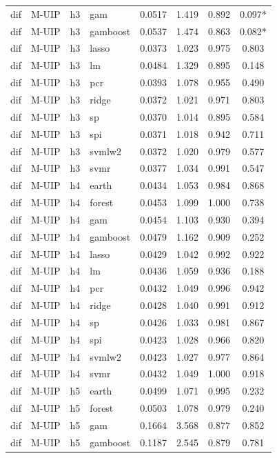 \begin{ThreePartTable}
\begin{longtable}[t]{llclcccc}
dif & M-UIP & h3 & gam & 0.0517 & 1.419 & 0.892 & 0.097*\\
dif & M-UIP & h3 & gamboost & 0.0537 & 1.474 & 0.863 & 0.082*\\
dif & M-UIP & h3 & lasso & 0.0373 & 1.023 & 0.975 & 0.803\\
dif & M-UIP & h3 & lm & 0.0484 & 1.329 & 0.895 & 0.148\\
dif & M-UIP & h3 & pcr & 0.0393 & 1.078 & 0.955 & 0.490\\
dif & M-UIP & h3 & ridge & 0.0372 & 1.021 & 0.971 & 0.803\\
dif & M-UIP & h3 & sp & 0.0370 & 1.014 & 0.895 & 0.584\\
dif & M-UIP & h3 & spi & 0.0371 & 1.018 & 0.942 & 0.711\\
dif & M-UIP & h3 & svmlw2 & 0.0372 & 1.020 & 0.979 & 0.577\\
dif & M-UIP & h3 & svmr & 0.0377 & 1.034 & 0.991 & 0.547\\
\addlinespace
dif & M-UIP & h4 & earth & 0.0434 & 1.053 & 0.984 & 0.868\\
dif & M-UIP & h4 & forest & 0.0453 & 1.099 & 1.000 & 0.738\\
dif & M-UIP & h4 & gam & 0.0454 & 1.103 & 0.930 & 0.394\\
dif & M-UIP & h4 & gamboost & 0.0479 & 1.162 & 0.909 & 0.252\\
dif & M-UIP & h4 & lasso & 0.0429 & 1.042 & 0.992 & 0.922\\
dif & M-UIP & h4 & lm & 0.0436 & 1.059 & 0.936 & 0.188\\
dif & M-UIP & h4 & pcr & 0.0432 & 1.049 & 0.996 & 0.942\\
dif & M-UIP & h4 & ridge & 0.0428 & 1.040 & 0.991 & 0.912\\
dif & M-UIP & h4 & sp & 0.0426 & 1.033 & 0.981 & 0.867\\
dif & M-UIP & h4 & spi & 0.0423 & 1.028 & 0.966 & 0.820\\
dif & M-UIP & h4 & svmlw2 & 0.0423 & 1.027 & 0.977 & 0.864\\
dif & M-UIP & h4 & svmr & 0.0432 & 1.049 & 1.000 & 0.918\\
\addlinespace
dif & M-UIP & h5 & earth & 0.0499 & 1.071 & 0.995 & 0.232\\
dif & M-UIP & h5 & forest & 0.0503 & 1.078 & 0.979 & 0.240\\
dif & M-UIP & h5 & gam & 0.1664 & 3.568 & 0.877 & 0.852\\
dif & M-UIP & h5 & gamboost & 0.1187 & 2.545 & 0.879 & 0.781\\

\end{longtable}
\end{ThreePartTable}
